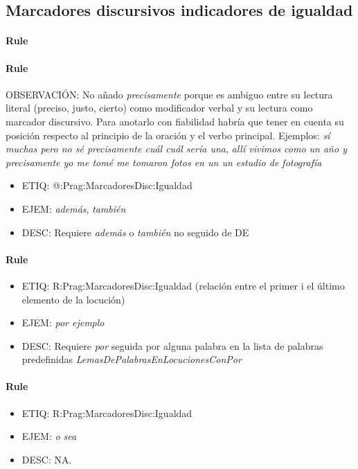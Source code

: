 \documentclass[11pt]{report}
\begin{document}
\subsection{Marcadores discursivos indicadores de igualdad}
\paragraph*{Rule}
\paragraph*{Rule}
OBSERVACIÓN: No añado \emph{precisamente} porque es ambiguo entre su lectura literal (preciso, justo, cierto) como modificador verbal y su lectura como marcador discursivo. Para anotarlo con fiabilidad habría que tener en cuenta su posición respecto al principio de la oración y el verbo principal. Ejemplos: \emph{sí muchas pero no sé precisamente cuál cuál sería una}, \emph{allí vivimos como un año y precisamente yo me tomé me tomaron fotos en un un estudio de fotografía}

\begin{itemize}
\item ETIQ: @:Prag:MarcadoresDisc:Igualdad
\item EJEM: \emph{además}, \emph{también}
\item DESC: Requiere \emph{además} o \emph{también} no seguido de DE
\end{itemize}

\paragraph*{Rule}
\begin{itemize}
\item ETIQ: R:Prag:MarcadoresDisc:Igualdad (relación entre el primer i el último elemento de la locución)
\item EJEM: \emph{por ejemplo}
\item DESC: Requiere \emph{por} seguida por alguna palabra en la lista de palabras predefinidas \emph{LemasDePalabrasEnLocucionesConPor}
\end{itemize}

\paragraph*{Rule}
\begin{itemize}
\item ETIQ: R:Prag:MarcadoresDisc:Igualdad
\item EJEM: \emph{o sea}
\item DESC: NA.
\end{itemize}
\end{document}
